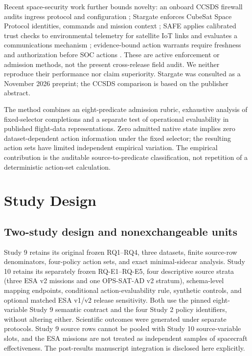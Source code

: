 \documentclass[preprint,12pt]{elsarticle}
\begin{document}
Recent space-security work further bounds novelty: an onboard CCSDS firewall audits ingress protocol and configuration \cite{im2026ccsds}; Stargate enforces CubeSat Space Protocol identities, commands and mission context \cite{ramsey2026stargate}; SAFE applies calibrated trust checks to environmental telemetry for satellite IoT links and evaluates a communications mechanism \cite{qasim2026safe}; evidence-bound action warrants require freshness and authorization before SOC actions \cite{torstensson2026warrants}. These are active enforcement or admission methods, not the present cross-release field audit. We neither reproduce their performance nor claim superiority. Stargate was consulted as a November 2026 preprint; the CCSDS comparison is based on the publisher abstract.

The method combines an eight-predicate admission rubric, exhaustive analysis of fixed-selector completions and a separate test of operational evaluability in published flight-data representations. Zero admitted native state implies zero dataset-dependent action information under the fixed selector; the resulting action sets have limited independent empirical variation. The empirical contribution is the auditable source-to-predicate classification, not repetition of a deterministic action-set calculation.

\section{Study Design}

\subsection{Two-study design and nonexchangeable units}
Study 9 retains its original frozen RQ1--RQ4, three datasets, finite source-row denominators, four-policy action sets, and exact minimal-sidecar analysis. Study 10 retains its separately frozen RQ-E1--RQ-E5, four descriptive source strata (three ESA v2 missions and one OPS-SAT-AD v2 stratum), schema-level mapping endpoints, conditional action-evaluability rule, synthetic controls, and optional matched ESA v1/v2 release sensitivity. Both use the pinned eight-variable Study 9 semantic contract and the four Study 2 policy identifiers, without altering either. Scientific outcomes were generated under separate protocols. Study 9 source rows cannot be pooled with Study 10 source-variable slots, and the ESA missions are not treated as independent samples of spacecraft effectiveness. The post-results manuscript integration is disclosed here explicitly.
\end{document}
